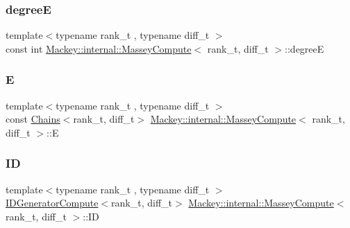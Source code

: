 \mbox{\label{structMackey_1_1internal_1_1MasseyCompute_ad8589930ebb2e353da168156bac31724}} 
\subsubsection{\texorpdfstring{degreeE}{degreeE}}
{\footnotesize\ttfamily template$<$typename rank\+\_\+t , typename diff\+\_\+t $>$ \\
const int \hyperlink{structMackey_1_1internal_1_1MasseyCompute}{Mackey\+::internal\+::\+Massey\+Compute}$<$ rank\+\_\+t, diff\+\_\+t $>$\+::degreeE}

\mbox{\label{structMackey_1_1internal_1_1MasseyCompute_a0f80c1d40e4766efaa0bb628cd8fdd23}} 
\subsubsection{\texorpdfstring{E}{E}}
{\footnotesize\ttfamily template$<$typename rank\+\_\+t , typename diff\+\_\+t $>$ \\
const \hyperlink{classMackey_1_1Chains}{Chains}$<$rank\+\_\+t, diff\+\_\+t$>$ \hyperlink{structMackey_1_1internal_1_1MasseyCompute}{Mackey\+::internal\+::\+Massey\+Compute}$<$ rank\+\_\+t, diff\+\_\+t $>$\+::E}

\mbox{\label{structMackey_1_1internal_1_1MasseyCompute_a1add5b7efac554908917c922b05b192a}} 
\subsubsection{\texorpdfstring{ID}{ID}}
{\footnotesize\ttfamily template$<$typename rank\+\_\+t , typename diff\+\_\+t $>$ \\
\hyperlink{classMackey_1_1internal_1_1IDGeneratorCompute}{I\+D\+Generator\+Compute}$<$rank\+\_\+t, diff\+\_\+t$>$ \hyperlink{structMackey_1_1internal_1_1MasseyCompute}{Mackey\+::internal\+::\+Massey\+Compute}$<$ rank\+\_\+t, diff\+\_\+t $>$\+::ID}

